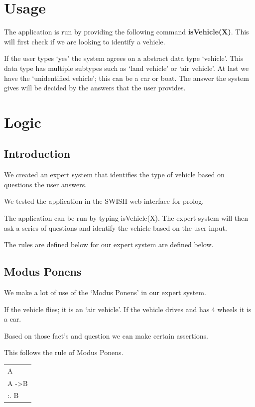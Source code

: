 \section{Usage} \label{man-usage}
The application is run by providing the following command \textbf{isVehicle(X)}.
This will first check if we are looking to identify a vehicle.

If the user types `yes' the system agrees on a abstract data type `vehicle'.
This data type has multiple subtypes such as `land vehicle' or `air vehicle'.
At last we have the `unidentified vehicle'; this can be a car or boat.
The answer the system gives will be decided by the answers that the user provides.

\newpage
\section{Logic} \label{man-logic}
\subsection{Introduction} \label{man-logic-introduction}
We created an expert system that identifies the type of vehicle based on
questions the user answers.

We tested the application in the SWISH web interface for prolog.

The application can be run by typing isVehicle(X).
The expert system will then ask a series of questions and identify the vehicle based on the user input.

The rules are defined below for our expert system are defined below.

\subsection{Modus Ponens} \label{man-logic-modus-ponens}
We make a lot of use of the `Modus Ponens' in our expert system.

If the vehicle flies; it is an `air vehicle'.
If the vehicle drives and has 4 wheels it is a car.

Based on those fact's and question we can make certain assertions.

This follows the rule of Modus Ponens.

\begin{tabular}{ l }
  A  \\
  A -\textgreater  B \\ \hline
  :. B \\
\end{tabular}

